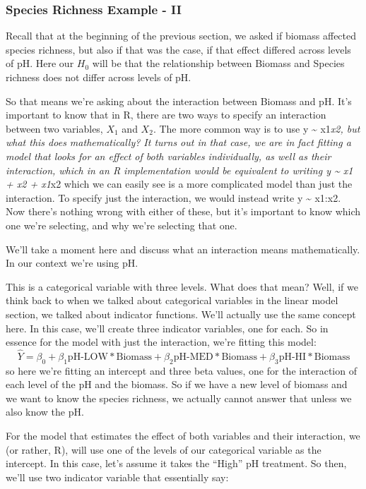\documentclass[
]{article}
\begin{document}
\hypertarget{species-richness-example---ii}{%
\subsubsection{Species Richness Example -
II}\label{species-richness-example---ii}}

Recall that at the beginning of the previous section, we asked if
biomass affected species richness, but also if that was the case, if
that effect differed across levels of pH. Here our \(H_0\) will be that
the relationship between Biomass and Species richness does not differ
across levels of pH.

So that means we're asking about the interaction between Biomass and pH.
It's important to know that in R, there are two ways to specify an
interaction between two variables, \(X_1\) and \(X_2\). The more common
way is to use y \textasciitilde{} x1\emph{x2, but what this does
mathematically? It turns out in that case, we are in fact fitting a
model that looks for an effect of both variables individually, as well
as their interaction, which in an R implementation would be equivalent
to writing y \textasciitilde{} x1 + x2 + x1}x2 which we can easily see
is a more complicated model than just the interaction. To specify just
the interaction, we would instead write y \textasciitilde{} x1:x2. Now
there's nothing wrong with either of these, but it's important to know
which one we're selecting, and why we're selecting that one.

We'll take a moment here and discuss what an interaction means
mathematically. In our context we're using pH.

This is a categorical variable with three levels. What does that mean?
Well, if we think back to when we talked about categorical variables in
the linear model section, we talked about indicator functions. We'll
actually use the same concept here. In this case, we'll create three
indicator variables, one for each. So in essence for the model with just
the interaction, we're fitting this model:
\[\hat{Y} = \beta_0 + \beta_1\text{pH-LOW}*\text{Biomass} + \beta_2\text{pH-MED}*\text{Biomass} + \beta_3\text{pH-HI}*\text{Biomass}\]
so here we're fitting an intercept and three beta values, one for the
interaction of each level of the pH and the biomass. So if we have a new
level of biomass and we want to know the species richness, we actually
cannot answer that unless we also know the pH.

For the model that estimates the effect of both variables and their
interaction, we (or rather, R), will use one of the levels of our
categorical variable as the intercept. In this case, let's assume it
takes the ``High'' pH treatment. So then, we'll use two indicator
variable that essentially say:
\end{document}
